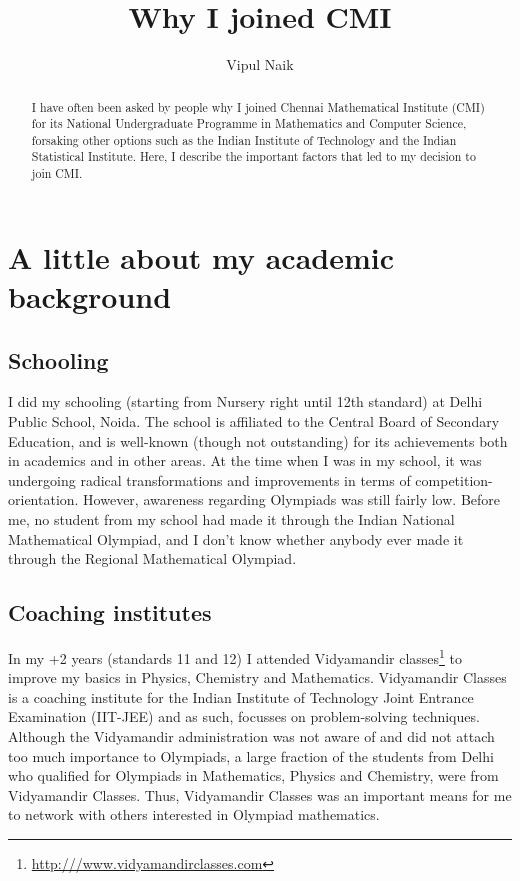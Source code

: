 \documentclass[a4paper]{amsart}
\title{Why I joined CMI}
\author{Vipul Naik}
\begin{document}
\maketitle

\begin{abstract}
  I have often been asked by people why I joined Chennai Mathematical
  Institute (CMI) for its National Undergraduate Programme in
  Mathematics and Computer Science, forsaking other options such as
  the Indian Institute of Technology and the Indian Statistical
  Institute. Here, I describe the important factors that led to my
  decision to join CMI.
\end{abstract}

\section{A little about my academic background}

\subsection{Schooling}

I did my schooling (starting from Nursery right until 12th standard)
at Delhi Public School, Noida. The school is affiliated to the Central
Board of Secondary Education, and is well-known (though not
outstanding) for its achievements both in academics and in other
areas. At the time when I was in my school, it was undergoing radical
transformations and improvements in terms of competition-orientation.
However, awareness regarding Olympiads was still fairly low. Before
me, no student from my school had made it through the Indian National
Mathematical Olympiad, and I don't know whether anybody ever made it
through the Regional Mathematical Olympiad.

\subsection{Coaching institutes}

In my +2 years (standards 11 and 12) I attended Vidyamandir
classes\footnote{\url{http:///www.vidyamandirclasses.com}} to improve
my basics in Physics, Chemistry and Mathematics. Vidyamandir Classes
is a coaching institute for the Indian Institute of Technology Joint
Entrance Examination (IIT-JEE) and as such, focusses on
problem-solving techniques. Although the Vidyamandir administration
was not aware of and did not attach too much importance to Olympiads,
a large fraction of the students from Delhi who qualified for
Olympiads in Mathematics, Physics and Chemistry, were from Vidyamandir
Classes.  Thus, Vidyamandir Classes was an important means for me to
network with others interested in Olympiad mathematics.
\end{document}
